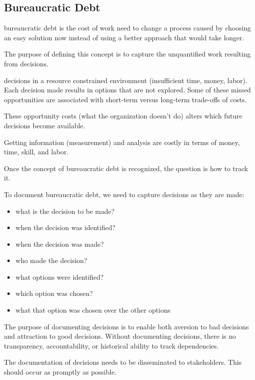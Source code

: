 \subsection{Bureaucratic Debt}


\gls{bureaucratic debt} is the cost of work need to change a process caused by choosing an easy solution now instead of using a better approach that would take longer.

The purpose of defining this concept is to capture the unquantified work resulting from decisions.


decisions in a resource constrained environment (insufficient time, money, labor). Each decision made results in options that are not explored. Some of these missed opportunities are associated with short-term versus long-term trade-offs of costs.

These opportunity costs (what the organization doesn't do) alters which future decisions become available.

Getting information (measurement) and analysis are costly in terms of money, time, skill, and labor.

Once the concept of bureaucratic debt is recognized, the question is how to track it.

To document bureaucratic debt, we need to capture decisions as they are made:
\begin{itemize}
    \item what is the decision to be made?
    \item when the decision was identified?
    \item when the decision was made?
    \item who made the decision?
    \item what options were identified?
    \item which option was chosen?
    \item what that option was chosen over the other options
\end{itemize}
The purpose of documenting decisions is to enable both aversion to bad decisions and attraction to good decisions. Without documenting decisions, there is no transparency, accountability, or historical ability to track dependencies. 

The documentation of decisions needs to be disseminated to stakeholders. This should occur as promptly as possible. 

